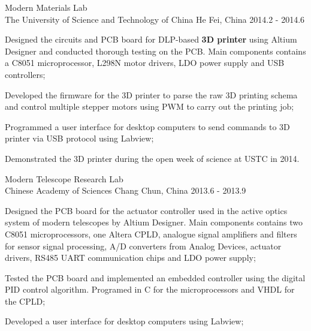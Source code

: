 \begin{cventries}
      {Modern Materials Lab \\ The University of Science and Technology of China}%
      {He Fei, China}%
      {2014.2 - 2014.6}%
      {
        \begin{cvitems}
          \item Designed the circuits and PCB board for DLP-based \textbf{3D printer} using Altium Designer and conducted thorough testing on the PCB. Main components contains a C8051 microprocessor, L298N motor drivers, LDO power supply and USB controllers;
          \item Developed the firmware for the 3D printer to parse the raw 3D printing schema and control multiple stepper motors using PWM to carry out the printing job;
          \item Programmed a user interface for desktop computers to send commands to 3D printer via USB protocol using Labview;
          \item Demonstrated the 3D printer during the open week of science at USTC in 2014.
        \end{cvitems}
      }

        {Modern Telescope Research Lab \\ Chinese Academy of Sciences}%
        {Chang Chun, China}%
        {2013.6 - 2013.9}%
        {
          \begin{cvitems}
            \item Designed the PCB board for the actuator controller used in the active optics system of modern telescopes by Altium Designer. Main components contains two C8051 microprocessors, one Altera CPLD, analogue signal amplifiers and filters for sensor signal processing, A/D converters from Analog Devices, actuator drivers, RS485 UART communication chips and LDO power supply;
            \item Tested the PCB board and implemented an embedded controller using the digital PID control algorithm. Programed in C for the microprocessors and VHDL for the CPLD;
            \item Developed a user interface for desktop computers using Labview;
          \end{cvitems}
        }


\end{cventries}
